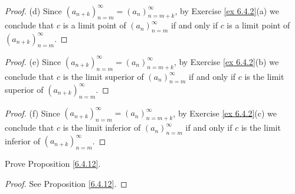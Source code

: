 \begin{proof}{(d)}
Since \((a_{n + k})_{n = m}^\infty = (a_n)_{n = m + k}^\infty\), by Exercise \ref{ex 6.4.2}(a) we conclude that \(c\) is a limit point of \((a_n)_{n = m}^\infty\) if and only if \(c\) is a limit point of \((a_{n + k})_{n = m}^\infty\).
\end{proof}

\begin{proof}{(e)}
Since \((a_{n + k})_{n = m}^\infty = (a_n)_{n = m + k}^\infty\), by Exercise \ref{ex 6.4.2}(b) we conclude that \(c\) is the limit superior of \((a_n)_{n = m}^\infty\) if and only if \(c\) is the limit superior of \((a_{n + k})_{n = m}^\infty\).
\end{proof}

\begin{proof}{(f)}
Since \((a_{n + k})_{n = m}^\infty = (a_n)_{n = m + k}^\infty\), by Exercise \ref{ex 6.4.2}(c) we conclude that \(c\) is the limit inferior of \((a_n)_{n = m}^\infty\) if and only if \(c\) is the limit inferior of \((a_{n + k})_{n = m}^\infty\).
\end{proof}

\begin{exercise}\label{ex 6.4.3}
Prove Proposition \ref{6.4.12}.
\end{exercise}

\begin{proof}
See Proposition \ref{6.4.12}.
\end{proof}